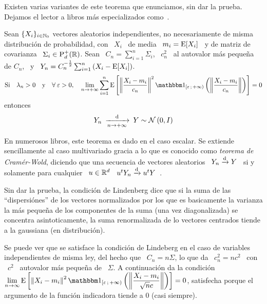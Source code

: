 Existen  varias   variantes  de  este   teorema  que  enunciamos,  sin   dar  la
prueba.  Dejamos el  lector a  libros m\'as  especializados como~\cite{AshDol99,
  Bil12, AthLah06, Lin22}.

\begin{teorema}\label{Teo:MP:LindenbergFeller}
%
  Sean  $\{  X_i \}_{i  \in  \mathbb{N}_0}$  vectores  aleatorios independientes,  no
  necesariamente de misma distribuci\'on de probabilidad, con \ $X_i$ \ de media
  \ $m_i = \operatorname{E}[X_i]$ \ y de matriz de covarianza \ $\Sigma_i \in \mathrm{P}_d^+(\mathbb{R})$.
  Sean \ $C_n = \sum_{i=1}^n \Sigma_i$, \ $c_n^2$ \ al autovalor m\'as peque\~na
  de $C_n$,  \ y  \ $Y_n  = C_n^{-\frac12} \sum_{i=1}^n  \left( X_i  - \operatorname{E}[X_i]
  \right)$.
  \[
  \mbox{Si} \quad \lambda_n > 0 \quad \mbox{y} \quad \forall \: \varepsilon > 0,
  \quad  \lim_{n  \to  +\infty}  \sum_{i=1}^n  \Esp\left[  \left\|  \frac{X_i  -
        m_i}{c_n} \right\|^2  \un_{\left[ \varepsilon \;  +\infty \right)}\left(
      \left\| \frac{X_i - m_i}{c_n} \right\| \right) \right] = 0
  \]
  entonces
  \[
  Y_n \: \xrightarrow[n \to +\infty]{\mathrm{d}} \: Y \sim \mathcal{N}\left( 0 , I \right)
  \]
\end{teorema}
%
En  numerosos libros,  este teorema  es  dado en  el caso  escalar. Se  extiende
sencillamente al caso multivariado gracia a lo que es conocido como {\it teorema
  de Cram\'er-Wold},  diciendo que una  secuencia de vectores aleatorios  \ $Y_n
\xrightarrow[]{\mathrm{d}}  Y$ \  si y  solamente para  cualquier \  $u \in  \mathbb{R}^d$ \  $u^t Y_n
\xrightarrow[]{\mathrm{d}} u^t Y$~\cite{AshDol99, AthLah06, Bil12}.

Sin dar  la prueba,  la condici\'on  de Lindenberg dice  que si  la suma  de las
``dispersi\'ones'' de  los vectores normalizados  por los que es  basicamente la
varianza  la   m\'as  peque\~na  de  los   componentes  de  la   suma  (una  vez
diagonalizada)  se  concentra  asintoticamente,  la  suma  renormalizada  de  lo
vectores centrados tiende a la gaussiana (en distribuci\'on).

Se  puede ver  que  se  satisface la  condici\'on  de Lindeberg  en  el caso  de
variables independientes de misma ley, del hecho  que \ $C_n = n \Sigma$, lo que
da \ $c_n^2 = n c^2$ \ con  \ $c^2$ \ autovalor m\'as peque\~na de \ $\Sigma$. A
continuaci\'on da la condici\'on \ $\displaystyle \lim_{n \to \infty} \Esp\left[
  \left\| X_i - m_i \right\|^2 \un_{\left[ \varepsilon \; +\infty \right)}\left(
    \left\|  \frac{X_i  -  m_i}{\sqrt{n}  c}  \right\|  \right)  \right]  =  0$,
satisfecha  porque el  argumento de  la funci\'on  indicadora tiende  a  0 (casi
siempre).

